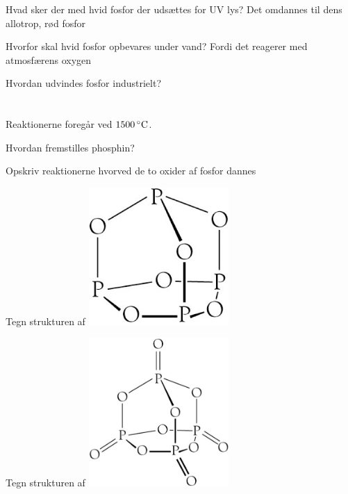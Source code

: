 \begin{flashcard}[Reaktion]{Hvad sker der med hvid fosfor der udsættes for UV lys?}
Det omdannes til dens allotrop, rød fosfor
\end{flashcard}

\begin{flashcard}[Reaktion]{Hvorfor skal hvid fosfor opbevares under vand?}
Fordi det reagerer med atmosfærens oxygen\\
\end{flashcard}

\begin{flashcard}[Fremstilling]{Hvordan udvindes fosfor industrielt?}
\\
 \\
\\ \vspace{7pt}
Reaktionerne foregår ved $\rm 1500\,^{\circ}{\rm C}$.
\end{flashcard}

\begin{flashcard}[Fremstilling]{Hvordan fremstilles phosphin?}
\end{flashcard}

\begin{flashcard}[Reaktion]{Opskriv reaktionerne hvorved de to oxider af fosfor dannes}
\\ \vspace{7pt}
\end{flashcard}

\begin{flashcard}[Struktur]{Tegn strukturen af }
\includegraphics[width=0.4\textwidth]{figures/k15s393P4O6.png}
\end{flashcard}

\begin{flashcard}[Struktur]{Tegn strukturen af }
\includegraphics[width=0.4\textwidth]{figures/k15s394P4O10.png}
\end{flashcard}


